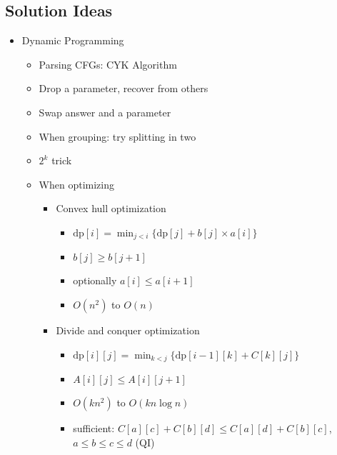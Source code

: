 \documentclass[11.5pt,a4paper,landscape,oneside]{amsart}
\newenvironment{myitemize}
{ \begin{itemize}[leftmargin=.5cm]
    \setlength{\itemsep}{0pt}
    \setlength{\parskip}{0pt}
    \setlength{\parsep}{0pt}     }
{ \end{itemize}                  }
\begin{document}
\begin{multicols*}{2}
        \subsection{Solution Ideas}
            \begin{myitemize}
                \item Dynamic Programming
                    \begin{itemize}
                        \item Parsing CFGs: CYK Algorithm
                        \item Drop a parameter, recover from others
                        \item Swap answer and a parameter
                        \item When grouping: try splitting in two
                        \item $2^k$ trick
                        \item When optimizing
                            \begin{itemize}
                                \item Convex hull optimization
                                    \begin{itemize}
                                        \item $\mathrm{dp}[i] = \min_{j<i}\{\mathrm{dp}[j] + b[j] \times a[i]\}$
                                        \item $b[j] \geq b[j+1]$
                                        \item optionally $a[i] \leq a[i+1]$
                                        \item $O(n^2)$ to $O(n)$
                                    \end{itemize}
                                \item Divide and conquer optimization
                                    \begin{itemize}
                                        \item $\mathrm{dp}[i][j] = \min_{k<j}\{\mathrm{dp}[i-1][k] + C[k][j]\}$
                                        \item $A[i][j] \leq A[i][j+1]$
                                        \item $O(kn^2)$ to $O(kn\log{n})$
                                        \item sufficient: $C[a][c] + C[b][d] \leq C[a][d] + C[b][c]$, $a\leq b\leq c\leq d$ (QI)
                                    \end{itemize}

\end{itemize}
\end{itemize}
\end{myitemize}
\end{multicols*}
\end{document}
